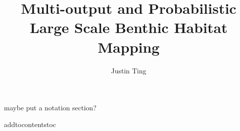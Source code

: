 \documentclass{usydthesis}
\title{{\bf\Huge Multi-output and Probabilistic Large Scale Benthic Habitat Mapping}}
\author{Justin Ting}
\theoremstyle{definition}
\newcommand{\todo}[1]{{\color{red} #1}}
\renewcommand{\thepage}{\roman{page}}
\begin{document}
\maketitle


\cleardoublepage
{}

\cleardoublepage
{}

\cleardoublepage
{}


\cleardoublepage
\setcounter{tocdepth}{2}
\setcounter{secnumdepth}{4}
\tableofcontents

{\makeatletter
\renewcommand*\numberline[1]{\hb@xt@\@tempdima{#1 \hfil}\hspace*{1em}}
\makeatother
\cleardoublepage
}

\setcounter{page}{1}
\setcounter{chapter}{0}

\renewcommand{\thepage}{\arabic{page}}	
\setupParagraphs

\todo{maybe put a notation section?}











{
\cleardoublepage
{}

}

\appendix
addtocontents{toc}{\protect\setcounter{tocdepth}{1}}
% 

\end{document}
